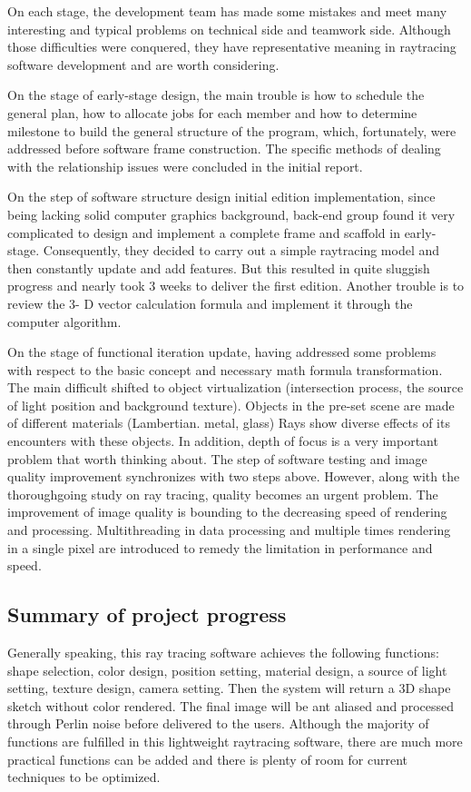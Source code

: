 \documentclass[11pt]{article}
\begin{document}
On each stage, the development team has made some mistakes and meet many interesting and typical problems on technical side and teamwork side. Although those difficulties were conquered, they have representative meaning in raytracing software development and are worth considering.

On the stage of early-stage design, the main trouble is how to schedule the general plan, how to allocate jobs for each member and how to determine milestone to build the general structure of the program, which, fortunately, were addressed before software frame construction. The specific methods of dealing with the relationship issues were concluded in the initial report.

On the step of software structure design initial edition implementation, since being lacking solid computer graphics background, back-end group found it very complicated to design and implement a complete frame and scaffold in early-stage. Consequently, they decided to carry out a simple raytracing model and then constantly update and add features. But this resulted in quite sluggish progress and nearly took 3 weeks to deliver the first edition. Another trouble is to review the 3- D vector calculation formula and implement it through the computer algorithm.

On the stage of functional iteration update, having addressed some problems with respect to the basic concept and necessary math formula transformation. The main difficult shifted to object virtualization (intersection process, the source of light position and background texture). Objects in the pre-set scene are made of different materials (Lambertian. metal, glass) Rays show diverse effects of its encounters with these objects. In addition, depth of focus is a very important problem that worth thinking about. The step of software testing and image quality improvement synchronizes with two steps above. However, along with the thoroughgoing study on ray tracing, quality becomes an urgent problem. The improvement of image quality is bounding to the decreasing speed of rendering and processing.  Multithreading in data processing and multiple times rendering in a single pixel are introduced to remedy the limitation in performance and speed.

\subsection{Summary of project progress}
Generally speaking, this ray tracing software achieves the following functions: shape selection, color design, position setting, material design, a source of light setting, texture design, camera setting. Then the system will return a 3D shape sketch without color rendered. The final image will be ant aliased and processed through Perlin noise before delivered to the users. Although the majority of functions are fulfilled in this lightweight raytracing software, there are much more practical functions can be added and there is plenty of room for current techniques to be optimized.
\end{document}
